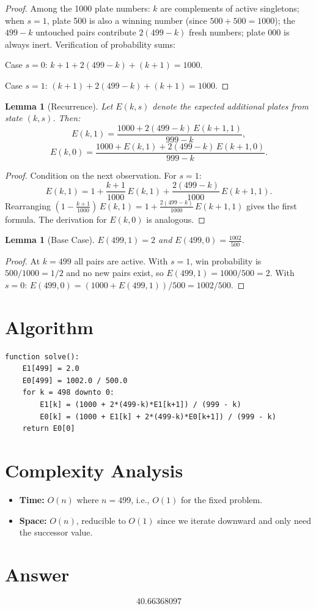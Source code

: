 \documentclass[12pt]{article}
\newtheorem{lemma}[theorem]{Lemma}
\begin{document}
\begin{proof}
Among the 1000 plate numbers: $k$ are complements of active singletons; when $s=1$, plate 500 is also a winning number (since $500+500=1000$); the $499-k$ untouched pairs contribute $2(499-k)$ fresh numbers; plate 000 is always inert. Verification of probability sums:

Case $s=0$: $k + 1 + 2(499-k) + (k+1) = 1000$.

Case $s=1$: $(k+1) + 2(499-k) + (k+1) = 1000$. \qedhere
\end{proof}

\begin{lemma}[Recurrence]
Let $E(k,s)$ denote the expected additional plates from state $(k,s)$. Then:
\[
E(k,1) = \frac{1000 + 2(499-k)\,E(k{+}1,1)}{999-k},
\]
\[
E(k,0) = \frac{1000 + E(k,1) + 2(499-k)\,E(k{+}1,0)}{999-k}.
\]
\end{lemma}

\begin{proof}
Condition on the next observation. For $s=1$:
\[
E(k,1) = 1 + \frac{k+1}{1000}\,E(k,1) + \frac{2(499-k)}{1000}\,E(k{+}1,1).
\]
Rearranging $(1 - \frac{k+1}{1000})\,E(k,1) = 1 + \frac{2(499-k)}{1000}\,E(k{+}1,1)$ gives the first formula. The derivation for $E(k,0)$ is analogous.
\end{proof}

\begin{lemma}[Base Case]
$E(499,1) = 2$ and $E(499,0) = \tfrac{1002}{500}$.
\end{lemma}

\begin{proof}
At $k=499$ all pairs are active. With $s=1$, win probability is $500/1000 = 1/2$ and no new pairs exist, so $E(499,1) = 1000/500 = 2$. With $s=0$: $E(499,0) = (1000 + E(499,1))/500 = 1002/500$.
\end{proof}

\section{Algorithm}

\begin{verbatim}
function solve():
    E1[499] = 2.0
    E0[499] = 1002.0 / 500.0
    for k = 498 downto 0:
        E1[k] = (1000 + 2*(499-k)*E1[k+1]) / (999 - k)
        E0[k] = (1000 + E1[k] + 2*(499-k)*E0[k+1]) / (999 - k)
    return E0[0]
\end{verbatim}

\section{Complexity Analysis}

\begin{itemize}
\item \textbf{Time:} $O(n)$ where $n = 499$, i.e., $O(1)$ for the fixed problem.
\item \textbf{Space:} $O(n)$, reducible to $O(1)$ since we iterate downward and only need the successor value.
\end{itemize}

\section{Answer}

\[
\boxed{40.66368097}
\]
\end{document}
